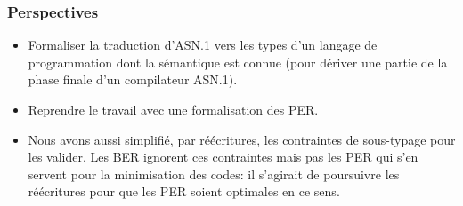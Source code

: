 \documentclass[compress,dvips,xcolor={dvipsnames},t]{beamer}
\begin{document}
\begin{frame}
\frametitle{Perspectives}

\begin{itemize}

  \item Formaliser la traduction d'\mbox{ASN.1} vers les types d'un
        langage de programmation dont la sémantique est connue (pour
        dériver une partie de la phase finale d'un compilateur
        \mbox{ASN.1}).

  \item Reprendre le travail avec une formalisation des PER.

  \item Nous avons aussi simplifié, par réécritures, les contraintes
        de sous-typage pour les valider. Les BER ignorent ces
        contraintes mais pas les PER qui s'en servent pour la
        minimisation des codes: il s'agirait de poursuivre les
        réécritures pour que les PER soient optimales en ce sens.

\end{itemize}
\end{frame}

%
\end{document}

